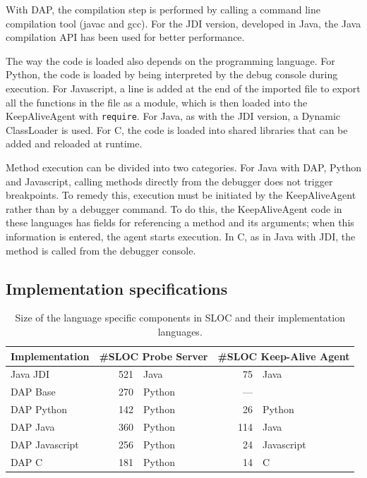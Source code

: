 \documentclass[english,submission]{programming}
\newcommand{\code}[1]{\colorbox{codegray}{\texttt{#1}}}
\begin{document}
With DAP, the compilation step is performed by calling a command line compilation tool (javac and gcc). For the JDI version, developed in Java, the Java compilation API has been used for better performance.

The way the code is loaded also depends on the programming language. For Python, the code is loaded by being interpreted by the debug console during execution.
For Javascript, a line is added at the end of the imported file to export all the functions in the file as a module, which is then loaded into the KeepAliveAgent with \code{require}.
For Java, as with the JDI version, a Dynamic ClassLoader is used. For C, the code is loaded into shared libraries that can be added and reloaded at runtime.

Method execution can be divided into two categories.
For Java with DAP, Python and Javascript, calling methods directly from the debugger does not trigger breakpoints. To remedy this, execution must be initiated by the KeepAliveAgent rather than by a debugger command. 
To do this, the KeepAliveAgent code in these languages has fields for referencing a method and its arguments; when this information is entered, the agent starts execution.
In C, as in Java with JDI, the method is called from the debugger console.

\subsection{Implementation specifications}

\begin{table}[!ht]
  \noindent\setlength\tabcolsep{4pt}%
  \begin{tabular}{lrlrl}
      \toprule
      Implementation & \multicolumn{2}{l}{\#SLOC Probe Server} & \multicolumn{2}{l}{\#SLOC Keep-Alive Agent} \\
      \midrule
      Java JDI & 521 & Java & 75 & Java \\ 
      DAP Base & 270  & Python & --- & \\ 
      DAP Python & 142 & Python & 26 & Python \\ 
      DAP Java & 360 & Python & 114 & Java \\ 
      DAP Javascript & 256 & Python & 24 & Javascript \\ 
      DAP C & 181 & Python & 14 & C \\
      \bottomrule
  \end{tabular}
  \caption{Size of the language specific components in SLOC and their implementation languages.}
  \label{tab:sloc}
\end{table}
\end{document}
